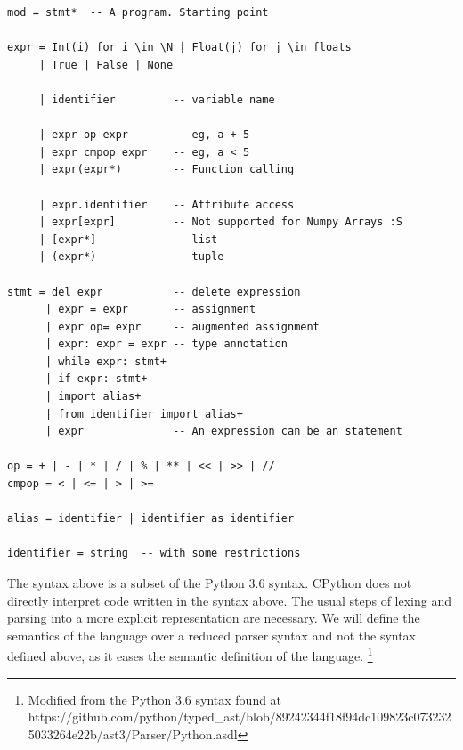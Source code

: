 \documentclass[
11pt, %
english, %
singlespacing, %
headsepline, %
]{MastersDoctoralThesis} %
\begin{document}
\begin{verbatim}
mod = stmt*  -- A program. Starting point

expr = Int(i) for i \in \N | Float(j) for j \in floats
     | True | False | None

     | identifier         -- variable name

     | expr op expr       -- eg, a + 5
     | expr cmpop expr    -- eg, a < 5
     | expr(expr*)        -- Function calling

     | expr.identifier    -- Attribute access
     | expr[expr]         -- Not supported for Numpy Arrays :S
     | [expr*]            -- list
     | (expr*)            -- tuple

stmt = del expr           -- delete expression
      | expr = expr       -- assignment
      | expr op= expr     -- augmented assignment
      | expr: expr = expr -- type annotation
      | while expr: stmt+
      | if expr: stmt+
      | import alias+
      | from identifier import alias+
      | expr              -- An expression can be an statement

op = + | - | * | / | % | ** | << | >> | //
cmpop = < | <= | > | >=

alias = identifier | identifier as identifier

identifier = string  -- with some restrictions
\end{verbatim}

The syntax above is a subset of the Python 3.6 syntax. CPython does not
directly interpret code written in the syntax above. The usual steps of
lexing and parsing into a more explicit representation are necessary. We
will define the semantics of the language over a reduced parser syntax
and not the syntax defined above, as it eases the semantic definition of
the language. \footnote{Modified from the Python 3.6 syntax found at
  https://github.com/python/typed\_ast/blob/89242344f18f94dc109823c0732325033264e22b/ast3/Parser/Python.asdl}
\end{document}
